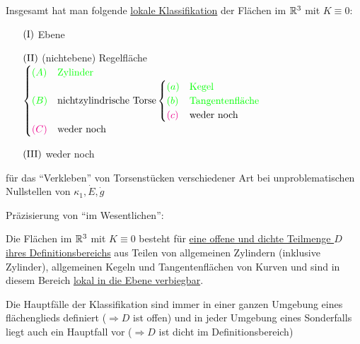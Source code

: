 Insgesamt hat man folgende \uline{lokale Klassifikation} der Flächen im \(\mathbb{R}^3\) mit \(K \equiv 0\):
\begin{enumerate}
 \item[{\color{green}\((\Rom1)\)}] {\color{green}Ebene}
 \item[{\color{green}\((\Rom2)\)}] (nichtebene) Regelfläche \(\begin{cases}
                                                             {\color{green}(A)} &{\color{green}\text{Zylinder}} \\
                                                             {\color{green}(B)} & \text{nichtzylindrische Torse} \begin{cases}
														{\color{green}(a)} &{\color{green}\text{Kegel}}\\
														{\color{green}(b)} &{\color{green}\text{Tangentenfläche}} \\
														{\color{magenta}(c)} &\text{weder noch}
													       \end{cases} \\
							      {\color{magenta}(C)}&\text{weder noch}
                                                            \end{cases}\)
 \item[{\color{magenta}\((\Rom3)\)}] weder noch
\end{enumerate}

\begin{bsp}
 für das "`Verkleben"' von Torsenstücken verschiedener Art bei unproblematischen Nullstellen von \(\kappa_1, \dot E, \dot g\)
\end{bsp}

Präzisierung von "`im Wesentlichen"':

\begin{satz}\label{satz265}
 Die Flächen im \(\mathbb{R}^3\) mit \(K \equiv 0\) besteht für \uline{eine offene und dichte Teilmenge \(D\) ihres Definitionsbereichs} aus Teilen von allgemeinen Zylindern (inklusive Zylinder), allgemeinen Kegeln und Tangentenflächen von Kurven und sind in diesem Bereich \uline{lokal in die Ebene verbiegbar}.
\end{satz}

\begin{beweis}
 Die Hauptfälle der Klassifikation sind immer in einer ganzen Umgebung eines flächenglieds definiert (\(\Rightarrow D\) ist offen) und in jeder Umgebung eines Sonderfalls liegt auch ein Hauptfall vor (\(\Rightarrow D\) ist dicht im Definitionsbereich)
\end{beweis}

